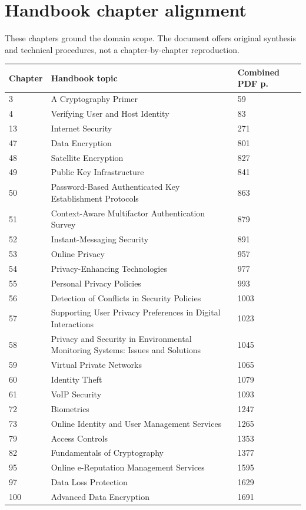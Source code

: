 \documentclass[10pt,letterpaper,oneside]{article}
\begin{document}
\section*{Handbook chapter alignment}
These chapters ground the domain scope. The document offers original synthesis and technical procedures, not a chapter-by-chapter reproduction.
\par\medskip\noindent\begin{longtable}{@{}p{}p{}p{}@{}}\toprule Chapter & Handbook topic & Combined PDF p. \\ \midrule\endhead3 & A Cryptography Primer & 59 \\
4 & Verifying User and Host Identity & 83 \\
13 & Internet Security & 271 \\
47 & Data Encryption & 801 \\
48 & Satellite Encryption & 827 \\
49 & Public Key Infrastructure & 841 \\
50 & Password-Based Authenticated Key Establishment Protocols & 863 \\
51 & Context-Aware Multifactor Authentication Survey & 879 \\
52 & Instant-Messaging Security & 891 \\
53 & Online Privacy & 957 \\
54 & Privacy-Enhancing Technologies & 977 \\
55 & Personal Privacy Policies & 993 \\
56 & Detection of Conflicts in Security Policies & 1003 \\
57 & Supporting User Privacy Preferences in Digital Interactions & 1023 \\
58 & Privacy and Security in Environmental Monitoring Systems: Issues and Solutions & 1045 \\
59 & Virtual Private Networks & 1065 \\
60 & Identity Theft & 1079 \\
61 & VoIP Security & 1093 \\
72 & Biometrics & 1247 \\
73 & Online Identity and User Management Services & 1265 \\
79 & Access Controls & 1353 \\
82 & Fundamentals of Cryptography & 1377 \\
95 & Online e-Reputation Management Services & 1595 \\
97 & Data Loss Protection & 1629 \\
100 & Advanced Data Encryption & 1691 \\
\bottomrule\end{longtable}\par\medskip
\end{document}
